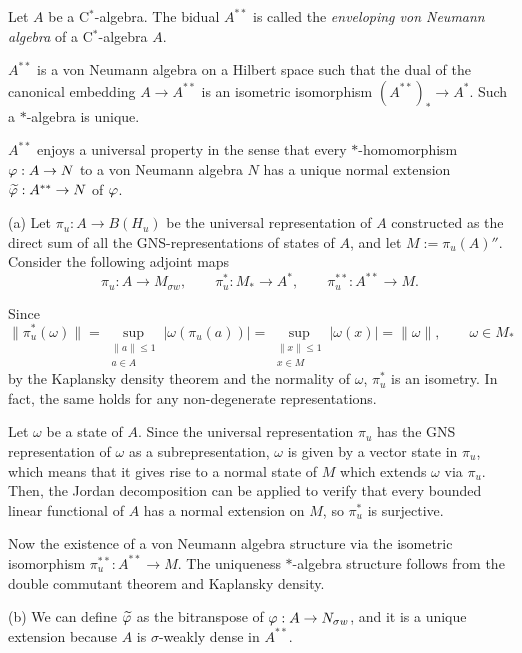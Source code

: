 \documentclass{../../large}
\begin{document}
\begin{prb}
Let $A$ be a C$^*$-algebra.
The bidual $A^{**}$ is called the \emph{enveloping von Neumann algebra} of a C$^*$-algebra $A$.
\begin{parts}
\item $A^{**}$ is a von Neumann algebra on a Hilbert space such that the dual of the canonical embedding $A\to A^{**}$ is an isometric isomorphism $(A^{**})_*\to A^*$.
Such a $*$-algebra is unique.
\item $A^{**}$ enjoys a universal property in the sense that every $*$-homomorphism $\varphi:A\to N$ to a von Neumann algebra $N$ has a unique normal extension $\widetilde{\varphi}:A^{**}\to N$ of $\varphi$.
\end{parts}
\end{prb}
\begin{pf}
(a)
Let $\pi_u:A\to B(H_u)$ be the universal representation of $A$ constructed as the direct sum of all the GNS-representations of states of $A$, and let $M:=\pi_u(A)''$.
Consider the following adjoint maps
\[\pi_u:A\to M_{\sigma w},\qquad\pi_u^*:M_*\to A^*,\qquad\pi_u^{**}:A^{**}\to M.\]

Since
\[\|\pi_u^*(\omega)\|=\sup_{\substack{\|a\|\le1\\a\in A}}|\omega(\pi_u(a))|=\sup_{\substack{\|x\|\le1\\x\in M}}|\omega(x)|=\|\omega\|,\qquad \omega\in M_*\]
by the Kaplansky density theorem and the normality of $\omega$, $\pi_u^*$ is an isometry.
In fact, the same holds for any non-degenerate representations.

Let $\omega$ be a state of $A$.
Since the universal representation $\pi_u$ has the GNS representation of $\omega$ as a subrepresentation, $\omega$ is given by a vector state in $\pi_u$, which means that it gives rise to a normal state of $M$ which extends $\omega$ via $\pi_u$.
Then, the Jordan decomposition can be applied to verify that every bounded linear functional of $A$ has a normal extension on $M$, so $\pi_u^*$ is surjective.

Now the existence of a von Neumann algebra structure via the isometric isomorphism $\pi_u^{**}:A^{**}\to M$.
The uniqueness $*$-algebra structure follows from the double commutant theorem and Kaplansky density.

(b)
We can define $\widetilde{\varphi}$ as the bitranspose of $\varphi:A\to N_{\sigma w}$, and it is a unique extension because $A$ is $\sigma$-weakly dense in $A^{**}$.
\end{pf}
\end{document}
